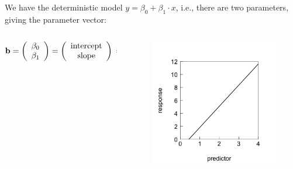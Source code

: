 \documentclass{beamer}
\begin{document}
\begin{frame}
    \frametitle{}
    We have the deterministic model $y = \beta_0 + \beta_1 \cdot x$, i.e., there are two parameters, giving the parameter vector:
    \begin{columns}
        \begin{column}{0.44\textwidth}
    \begin{equation*}
    \mathbf{b} = \left( \begin{array}{c} \beta_0 \\ \beta_1 \end{array} \right) = \left( \begin{array}{c} \text{intercept} \\ \text{slope} \end{array} \right) \\
    \begin{aligned}
        & = \left( \begin{array}{c} -1.44 \\ 3.27 \end{array} \right)
    \end{aligned}
\end{equation*}
    \end{column}
    \begin{column}{0.44\textwidth}
    \begin{figure}[h]
        \centering
        \includegraphics[width=0.999\textwidth]{lectures/day_2_LM_refresh_I/figures/unnamed-chunk-14-1.png}
    \end{figure}
    \end{column}
    \end{columns}
\end{frame}
\end{document}
